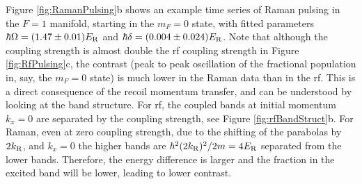 Figure \ref{fig:RamanPulsing}b shows an example time series of Raman pulsing in the $F=1$ manifold, starting in the $m_F=0$ state, with fitted parameters  $\hbar\Omega=(1.47\pm0.01) E_{\rm R}$ and $\hbar\delta = (0.004\pm0.024) E_{\rm R}$. Note that although the coupling strength is almost double the rf coupling strength in Figure \ref{fig:RfPulsing}c, the contrast (peak to peak oscillation of the fractional population in, say, the $m_F=0$ state) is much lower in the Raman data than in the rf. This is a direct consequence of the recoil momentum transfer, and can be understood by looking at the band structure. For rf, the coupled bands at initial momentum $k_x=0$ are separated by the coupling strength, see Figure \ref{fig:rfBandStruct}b. For Raman, even at zero coupling strength, due to the shifting of the parabolas by $2k_{\rm R}$, and $k_x=0$ the higher bands are $\hbar^2(2k_{\rm R})^2/2m=4E_{\rm R}$ separated from the lower bands. Therefore, the energy difference is larger and the fraction in the excited band will be lower, leading to lower contrast. 











